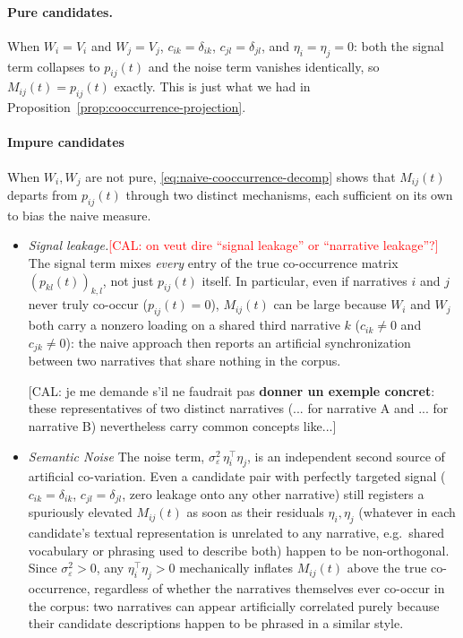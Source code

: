 \documentclass[
  journal=medium,
  manuscript=article-type,
  year=2025,
  volume=1,
]{cup-journal}
\begin{document}
\paragraph{Pure candidates.}
When $W_i=V_i$ and $W_j=V_j$, $c_{ik}=\delta_{ik}$, $c_{jl}=\delta_{jl}$, and
$\eta_i=\eta_j=0$: both the signal term collapses to $p_{ij}(t)$ and the
noise term vanishes identically, so $M_{ij}(t)=p_{ij}(t)$
exactly. This is just what we had in Proposition~\ref{prop:cooccurrence-projection}.

\paragraph{Impure candidates}
When $W_i,W_j$ are not pure, \eqref{eq:naive-cooccurrence-decomp} shows that
$M_{ij}(t)$ departs from $p_{ij}(t)$ through two distinct mechanisms, each
sufficient on its own to bias the naive measure.
\begin{itemize}
    \item \emph{Signal leakage.}\textcolor{red}{[CAL: on veut dire ``signal leakage'' or ``narrative leakage''?]} The signal term mixes \emph{every} entry of the true
    co-occurrence matrix $(p_{kl}(t))_{k,l}$, not just $p_{ij}(t)$ itself. In
    particular, even if narratives $i$ and $j$ never truly co-occur
    ($p_{ij}(t)=0$), $M_{ij}(t)$ can be large  because $W_i$ and $W_j$ both
    carry a nonzero loading on a shared third narrative $k$ ($c_{ik}\ne0$ and
    $c_{jk}\ne0$): the naive approach then reports an artificial
    synchronization between two narratives that share nothing in the corpus.
    
    {\color{red}[CAL: je me demande s'il ne faudrait pas \textbf{donner un exemple concret}: these representatives of two distinct narratives (... for narrative A and ... for narrative B) nevertheless carry common concepts like...]}

    \item \emph{Semantic Noise} The noise term, $\sigma_\varepsilon^2\,\eta_i^\top\eta_j$,
    is an independent second source of artificial co-variation. Even a candidate pair with
    perfectly targeted signal ($c_{ik}=\delta_{ik}$, $c_{jl}=\delta_{jl}$, zero
    leakage onto any other narrative) still registers a spuriously elevated
    $M_{ij}(t)$ as soon as their residuals $\eta_i,\eta_j$ 
    (whatever in each candidate's textual representation is unrelated to any
    narrative, e.g.\ shared vocabulary or phrasing used to describe both) happen
    to be non-orthogonal. Since $\sigma_\varepsilon^2>0$, any $\eta_i^\top\eta_j>0$
    mechanically inflates $M_{ij}(t)$ above the true co-occurrence, regardless of
    whether the narratives themselves ever co-occur in the corpus: two narratives
    can appear artificially correlated purely because their candidate
    descriptions happen to be phrased in a similar style.
\end{itemize}
\end{document}
